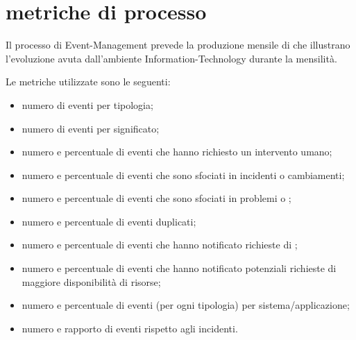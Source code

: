 %
%
\section[Metriche di processo]{metriche di processo}
\label{im-metrics}
Il processo di \ac{Event-Management} prevede la produzione mensile di  che illustrano l'evoluzione avuta dall'ambiente \acs{Information-Technology} durante la mensilità.

Le metriche utilizzate sono le seguenti:

\begin{itemize}
\item{numero di eventi per tipologia;}
\item{numero di eventi per significato;}
\item{numero e percentuale di eventi che hanno richiesto un intervento umano;}
\item{numero e percentuale di eventi che sono sfociati in incidenti o cambiamenti;}
\item{numero e percentuale di eventi che sono sfociati in problemi o ;}
\item{numero e percentuale di eventi duplicati;}
\item{numero e percentuale di eventi che hanno notificato richieste di ;}
\item{numero e percentuale di eventi che hanno notificato potenziali richieste di maggiore disponibilità di risorse;}
\item{numero e percentuale di eventi (per ogni tipologia) per sistema/applicazione;}
\item{numero e rapporto di eventi rispetto agli incidenti.}
\end{itemize}